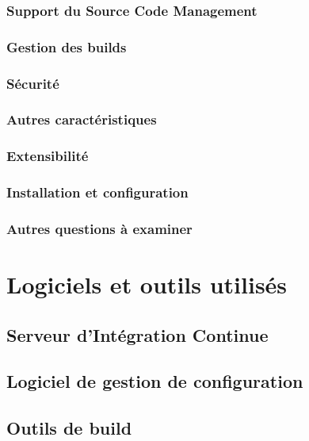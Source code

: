 \documentclass{report}
\begin{document}
          \subsubsection{Support du Source Code Management}

          \subsubsection{Gestion des builds}

          \subsubsection{Sécurité}

          \subsubsection{Autres caractéristiques}

          \subsubsection{Extensibilité}

          \subsubsection{Installation et configuration}

          \subsubsection{Autres questions à examiner}

      \section{Logiciels et outils utilisés}

        \subsection{Serveur d’Intégration Continue}

        \subsection{Logiciel de gestion de configuration}

        \subsection{Outils de build}
\end{document}
